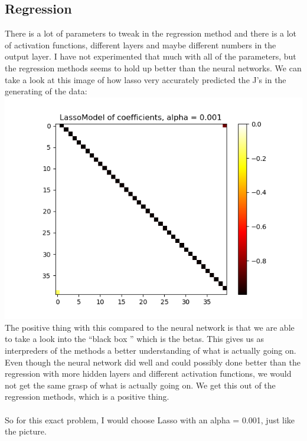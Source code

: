 \documentclass[a4paper,norsk]{article}
\begin{document}
\subsection{Regression}
There is a lot of parameters to tweak in the regression method and there is a lot of activation functions, different layers and maybe different numbers in the output layer. I have not experimented that much with all of the parameters, but the regression methods seems to hold up better than the neural networks. We can take a look at this image of how lasso very accurately predicted the J's in the generating of the data:\\
\includegraphics[scale=.7]{images/Lassocoef0001}\\
The positive thing with this compared to the neural network is that we are able to take a look into the ``black box '' which is the betas. This gives us as interpreders of the methods a better understanding of what is actually going on. Even though the neural network did well and could possibly done better than the regression with more hidden layers and different activation functions, we would not get the same grasp of what is actually going on. We get this out of the regression methods, which is a positive thing.\\
\\
So for this exact problem, I would choose Lasso with an alpha = 0.001, just like the picture.
\end{document}
